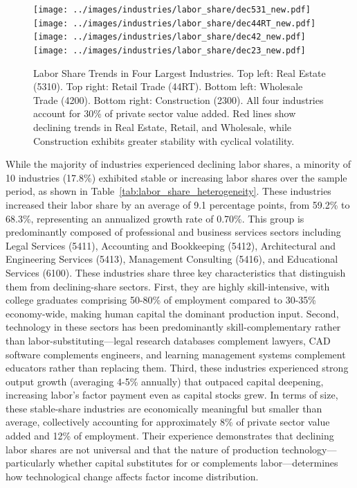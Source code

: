 \documentclass[12pt]{article}
\begin{document}
\begin{figure}%

 \centering
 \texttt{[image: ../images/industries/labor\_share/dec531\_new.pdf]}
 \hspace*{0.05\textwidth}
 \texttt{[image: ../images/industries/labor\_share/dec44RT\_new.pdf]}
 \vfill
 \texttt{[image: ../images/industries/labor\_share/dec42\_new.pdf]}
 \hspace*{0.05\textwidth}
 \texttt{[image: ../images/industries/labor\_share/dec23\_new.pdf]}
 \caption{\label{fig:labor_share_by_industry} Labor Share Trends in Four Largest Industries. Top left: Real Estate (5310). Top right: Retail Trade (44RT). Bottom left: Wholesale Trade (4200). Bottom right: Construction (2300). All four industries account for 30\% of private sector value added. Red lines show declining trends in Real Estate, Retail, and Wholesale, while Construction exhibits greater stability with cyclical volatility.}
\end{figure}

While the majority of industries experienced declining labor shares, a minority of 10 industries (17.8\%) exhibited stable or increasing labor shares over the sample period, as shown in Table~\ref{tab:labor_share_heterogeneity}. These industries increased their labor share by an average of 9.1 percentage points, from 59.2\% to 68.3\%, representing an annualized growth rate of 0.70\%. This group is predominantly composed of professional and business services sectors including Legal Services (5411), Accounting and Bookkeeping (5412), Architectural and Engineering Services (5413), Management Consulting (5416), and Educational Services (6100). These industries share three key characteristics that distinguish them from declining-share sectors. First, they are highly skill-intensive, with college graduates comprising 50-80\% of employment compared to 30-35\% economy-wide, making human capital the dominant production input. Second, technology in these sectors has been predominantly skill-complementary rather than labor-substituting---legal research databases complement lawyers, CAD software complements engineers, and learning management systems complement educators rather than replacing them. Third, these industries experienced strong output growth (averaging 4-5\% annually) that outpaced capital deepening, increasing labor's factor payment even as capital stocks grew. In terms of size, these stable-share industries are economically meaningful but smaller than average, collectively accounting for approximately 8\% of private sector value added and 12\% of employment. Their experience demonstrates that declining labor shares are not universal and that the nature of production technology---particularly whether capital substitutes for or complements labor---determines how technological change affects factor income distribution.
\end{document}
